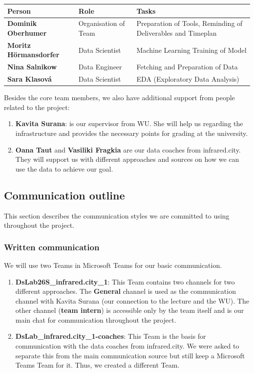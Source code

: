 \documentclass[12pt]{article}
\begin{document}
\begin{table}[htbp]
\centering
\begin{tabular}{@{}llp{6cm}@{}}
\toprule
\textbf{Person} & \textbf{Role} & \textbf{Tasks} \\
\midrule
\textbf{Dominik Oberhumer} & Organisation of Team & Preparation of Tools, Reminding of Deliverables and Timeplan \\
\textbf{Moritz Hörmansdorfer} & Data Scientist & Machine Learning Training of Model \\
\textbf{Nina Salnikow} & Data Engineer & Fetching and Preparation of Data  \\
\textbf{Sara Klasová} & Data Scientist & EDA (Exploratory Data Analysis)  \\
\bottomrule
\end{tabular}
\end{table}

Besides the core team members, we also have additional support from people related to the project:

\begin{enumerate}
    \item \textbf{Kavita Surana}: is our supervisor from WU. She will help us regarding the infrastructure and provides the necessary points for grading at the university.
    \item \textbf{Oana Taut} and \textbf{Vasiliki Fragkia} are our data coaches from infrared.city. They will support us with different approaches and sources on how we can use the data to achieve our goal.
\end{enumerate}

\subsection{Communication outline}

This section describes the communication styles we are committed to using throughout the project.

\subsubsection{Written communication}

We will use two Teams in Microsoft Teams for our basic communication.

\begin{enumerate}
    \item \textbf{DsLab26S\_infrared.city\_1}: This Team contains two channels for two different approaches. The \textbf{General} channel is used as the communication channel with Kavita Surana (our connection to the lecture and the WU). The other channel (\textbf{team intern}) is accessible only by the team itself and is our main chat for communication throughout the project.
    \item \textbf{DsLab\_infrared.city\_1-coaches}: This Team is the basis for communication with the data coaches from infrared.city. We were asked to separate this from the main communication source but still keep a Microsoft Teams Team for it. Thus, we created a different Team.
\end{enumerate}
\end{document}
